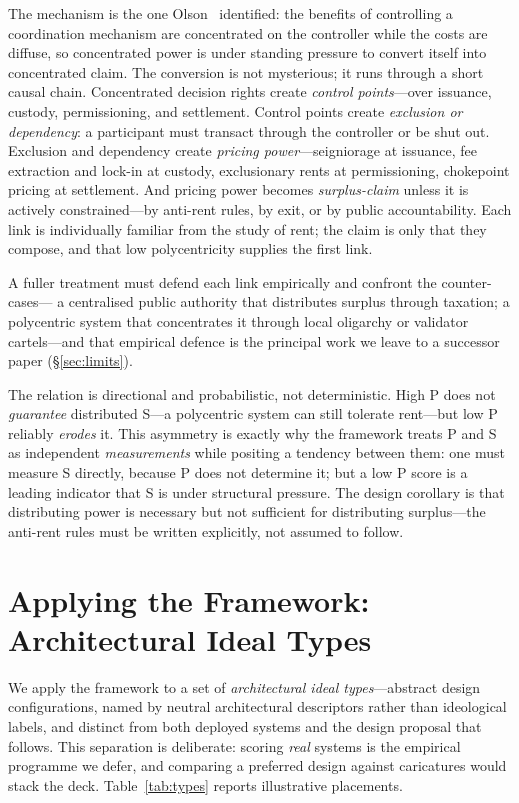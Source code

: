 \documentclass[11pt]{article}
\theoremstyle{definition}
\begin{document}
The mechanism is the one Olson~\cite{olson1965} identified: the benefits of
controlling a coordination mechanism are concentrated on the controller while the
costs are diffuse, so concentrated power is under standing pressure to convert itself
into concentrated claim. The conversion is not mysterious; it runs through a short
causal chain. Concentrated decision rights create \emph{control points}---over
issuance, custody, permissioning, and settlement. Control points create
\emph{exclusion or dependency}: a participant must transact through the controller or
be shut out. Exclusion and dependency create \emph{pricing power}---seigniorage at
issuance, fee extraction and lock-in at custody, exclusionary rents at permissioning,
chokepoint pricing at settlement. And pricing power becomes \emph{surplus-claim}
unless it is actively constrained---by anti-rent rules, by exit, or by public
accountability. Each link is individually familiar from the study of rent; the claim
is only that they compose, and that low polycentricity supplies the first link.

A fuller treatment must defend each link empirically and confront the counter-cases---
a centralised public authority that distributes surplus through taxation; a
polycentric system that concentrates it through local oligarchy or validator
cartels---and that empirical defence is the principal work we leave to a successor
paper (\S\ref{sec:limits}).

The relation is directional and probabilistic, not deterministic. High P does not
\emph{guarantee} distributed S---a polycentric system can still tolerate rent---but
low P reliably \emph{erodes} it. This asymmetry is exactly why the framework treats P
and S as independent \emph{measurements} while positing a tendency between them: one
must measure S directly, because P does not determine it; but a low P score is a
leading indicator that S is under structural pressure. The design corollary is that
distributing power is necessary but not sufficient for distributing surplus---the
anti-rent rules must be written explicitly, not assumed to follow.

\section{Applying the Framework: Architectural Ideal Types}
\label{sec:application}

We apply the framework to a set of \emph{architectural ideal types}---abstract design
configurations, named by neutral architectural descriptors rather than ideological
labels, and distinct from both deployed systems and the design proposal that follows.
This separation is deliberate: scoring \emph{real} systems is the empirical programme
we defer, and comparing a preferred design against caricatures would stack the deck.
Table~\ref{tab:types} reports illustrative placements.
\end{document}
